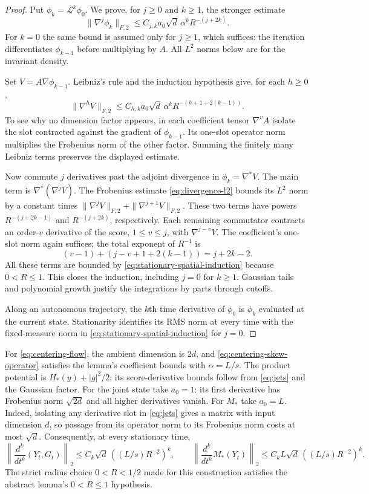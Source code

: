 \begin{proof}
Put $\phi_k=\mathcal L^k\phi_0$.  We prove, for $j\ge0$ and
$k\ge1$, the stronger estimate
\begin{equation}\label{eq:stationary-spatial-induction}
 \|\nabla^j\phi_k\|_{F,2}
 \le C_{j,k}a_0\sqrt d\,\alpha^kR^{-(j+2k)}.
\end{equation}
For $k=0$ the same bound is assumed only for $j\ge1$, which suffices:
the iteration differentiates $\phi_{k-1}$ before multiplying by $A$.
All $L^2$ norms below are for the invariant density.

Set $V=A\nabla\phi_{k-1}$.  Leibniz's rule and the induction
hypothesis give, for each $h\ge0$,
\[
 \|\nabla^h V\|_{F,2}
 \le C_{h,k}a_0\sqrt d\,\alpha^k
                         R^{-(h+1+2(k-1))}.
\]
To see why no dimension factor appears, in each coefficient tensor
$\nabla^vA$ isolate the slot contracted against the gradient of
$\phi_{k-1}$.  Its one-slot operator norm multiplies the Frobenius
norm of the other factor.  Summing the finitely many Leibniz terms
preserves the displayed estimate.

Now commute $j$ derivatives past the adjoint divergence in
$\phi_k=\nabla^*V$.  The main term is $\nabla^*(\nabla^jV)$.
The Frobenius estimate \eqref{eq:divergence-l2} bounds its $L^2$ norm
by a constant times
$\|\nabla^jV\|_{F,2}+\|\nabla^{j+1}V\|_{F,2}$.
These two terms have powers $R^{-(j+2k-1)}$ and
$R^{-(j+2k)}$, respectively.  Each remaining commutator contracts
an order-$v$ derivative of the score, $1\le v\le j$, with
$\nabla^{j-v}V$.  The coefficient's one-slot norm again suffices;
the total exponent of $R^{-1}$ is
\[
 (v-1)+(j-v+1+2(k-1))=j+2k-2.
\]
All these terms are bounded by
\eqref{eq:stationary-spatial-induction} because $0<R\le1$.
This closes the induction, including $j=0$ for $k\ge1$.
Gaussian tails and polynomial growth justify the integrations by
parts through cutoffs.

Along an autonomous trajectory, the $k$th time derivative of
$\phi_0$ is $\phi_k$ evaluated at the current state.  Stationarity
identifies its RMS norm at every time with the fixed-measure norm
in \eqref{eq:stationary-spatial-induction} for $j=0$.
\end{proof}

For \eqref{eq:centering-flow}, the ambient dimension is $2d$, and
\eqref{eq:centering-skew-operator} satisfies the lemma's coefficient
bounds with $\alpha=L/s$.  The product potential is
$H_*(y)+|g|^2/2$; its score-derivative bounds follow from
\eqref{eq:jets} and the Gaussian factor.  For the joint state take
$a_0=1$: its first derivative has Frobenius norm $\sqrt{2d}$ and
all higher derivatives vanish.  For $M_*$ take $a_0=L$.
Indeed, isolating any derivative slot in \eqref{eq:jets} gives a
matrix with input dimension $d$, so passage from its operator norm
to its Frobenius norm costs at most $\sqrt d$.
Consequently, at every stationary time,
\[
 \left\|\frac{d^k}{dt^k}(Y_t,G_t)\right\|_2
       \le C_k\sqrt d\,((L/s)R^{-2})^k,\qquad
 \left\|\frac{d^k}{dt^k}M_*(Y_t)\right\|_2
       \le C_kL\sqrt d\,((L/s)R^{-2})^k.
\]
The strict radius choice $0<R<1/2$ made for this construction
satisfies the abstract lemma's $0<R\le1$ hypothesis.

